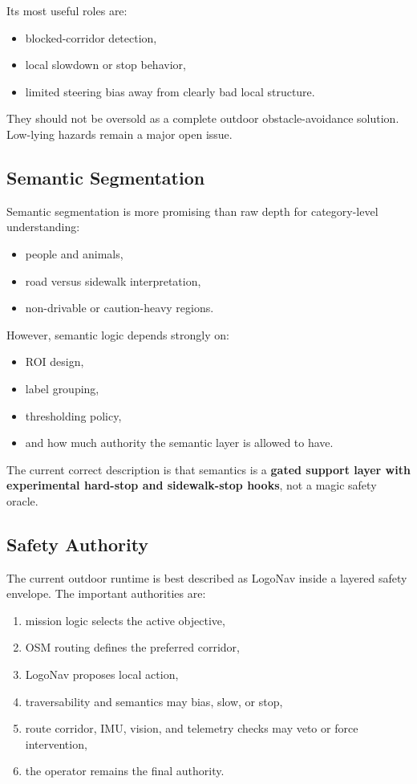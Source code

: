 \documentclass[11pt]{article}
\begin{document}
Its most useful roles are:
\begin{itemize}[leftmargin=*]
  \item blocked-corridor detection,
  \item local slowdown or stop behavior,
  \item limited steering bias away from clearly bad local structure.
\end{itemize}

They should not be oversold as a complete outdoor obstacle-avoidance solution. Low-lying hazards remain a major open issue.

\subsection{Semantic Segmentation}
Semantic segmentation is more promising than raw depth for category-level understanding:
\begin{itemize}[leftmargin=*]
  \item people and animals,
  \item road versus sidewalk interpretation,
  \item non-drivable or caution-heavy regions.
\end{itemize}

However, semantic logic depends strongly on:
\begin{itemize}[leftmargin=*]
  \item ROI design,
  \item label grouping,
  \item thresholding policy,
  \item and how much authority the semantic layer is allowed to have.
\end{itemize}

The current correct description is that semantics is a \textbf{gated support layer with experimental hard-stop and sidewalk-stop hooks}, not a magic safety oracle.

\subsection{Safety Authority}
The current outdoor runtime is best described as LogoNav inside a layered safety envelope. The important authorities are:
\begin{enumerate}[leftmargin=*]
  \item mission logic selects the active objective,
  \item OSM routing defines the preferred corridor,
  \item LogoNav proposes local action,
  \item traversability and semantics may bias, slow, or stop,
  \item route corridor, IMU, vision, and telemetry checks may veto or force intervention,
  \item the operator remains the final authority.
\end{enumerate}
\end{document}
